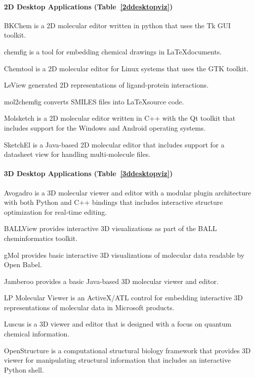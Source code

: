 \paragraph{2D Desktop Applications (Table~\ref{2ddesktopviz})}

BKChem is a 2D molecular editor written in python that uses the Tk GUI toolkit.

chemfig is a tool for embedding chemical drawings in \LaTeX documents.

Chemtool is a 2D molecular editor for Linux systems that uses the GTK toolkit.

LeView \cite{Caboche_2013} generated 2D representations of ligand-protein interactions.

mol2chemfig \cite{Brefo_Mensah_2012} converts SMILES files into \LaTeX source code.

Molsketch is a 2D molecular editor written in C++ with the Qt toolkit that includes support for the Windows and Android operating systems.

SketchEl is a Java-based 2D molecular editor that includes support for a datasheet view for handling multi-molecule files.

\paragraph{3D Desktop Applications (Table~\ref{3ddesktopviz})}

Avogadro \cite{Hanwell_2012} is a 3D molecular viewer and editor with a modular plugin architecture with both Python and C++ bindings that includes interactive structure optimization for real-time editing. 

BALLView \cite{Moll_2005} provides interactive 3D visualizations as part of the BALL \cite{Hildebrandt_2010} cheminformatics toolkit.

gMol provides basic interactive 3D visualizations of molecular data readable by Open Babel.

Jamberoo provides a basic Java-based 3D molecular viewer and editor.

LP Molecular Viewer is an ActiveX/ATL control for embedding interactive 3D representations of molecular data in Microsoft products.

Luscus \cite{Kova_evi__2015} is a 3D viewer and editor that is designed with a focus on quantum chemical information.

OpenStructure \cite{Biasini_2013} is a computational structural biology framework that provides 3D viewer for manipulating structural information that includes an interactive Python shell.

